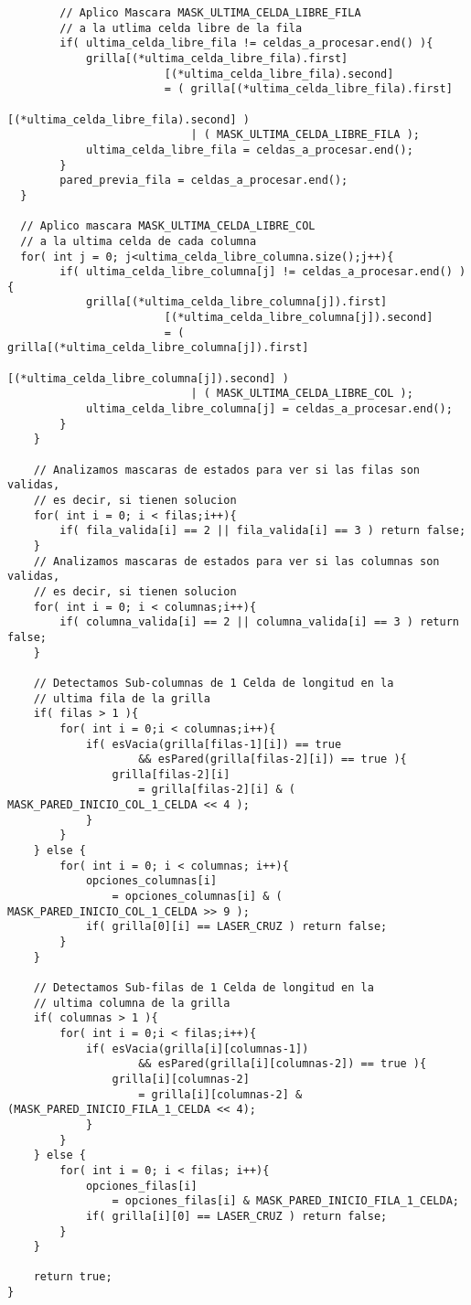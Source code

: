 \documentclass[11pt, a4paper, twoside]{article}
\begin{document}
\begin{lstlisting}
		// Aplico Mascara MASK_ULTIMA_CELDA_LIBRE_FILA
		// a la utlima celda libre de la fila
		if( ultima_celda_libre_fila != celdas_a_procesar.end() ){
			grilla[(*ultima_celda_libre_fila).first]
						[(*ultima_celda_libre_fila).second]
						= ( grilla[(*ultima_celda_libre_fila).first]
											[(*ultima_celda_libre_fila).second] )
							| ( MASK_ULTIMA_CELDA_LIBRE_FILA );
			ultima_celda_libre_fila = celdas_a_procesar.end();
		}
		pared_previa_fila = celdas_a_procesar.end();
  }
  
  // Aplico mascara MASK_ULTIMA_CELDA_LIBRE_COL
  // a la ultima celda de cada columna
  for( int j = 0; j<ultima_celda_libre_columna.size();j++){
		if( ultima_celda_libre_columna[j] != celdas_a_procesar.end() ){
			grilla[(*ultima_celda_libre_columna[j]).first]
						[(*ultima_celda_libre_columna[j]).second]
						= ( grilla[(*ultima_celda_libre_columna[j]).first]
											[(*ultima_celda_libre_columna[j]).second] )
							| ( MASK_ULTIMA_CELDA_LIBRE_COL );
			ultima_celda_libre_columna[j] = celdas_a_procesar.end();
		}
	}
	
	// Analizamos mascaras de estados para ver si las filas son validas,
	// es decir, si tienen solucion
	for( int i = 0; i < filas;i++){
		if( fila_valida[i] == 2 || fila_valida[i] == 3 ) return false;
	}
	// Analizamos mascaras de estados para ver si las columnas son validas,
	// es decir, si tienen solucion
	for( int i = 0; i < columnas;i++){
		if( columna_valida[i] == 2 || columna_valida[i] == 3 ) return false;
	}
	
	// Detectamos Sub-columnas de 1 Celda de longitud en la
	// ultima fila de la grilla
	if( filas > 1 ){
		for( int i = 0;i < columnas;i++){
			if( esVacia(grilla[filas-1][i]) == true
					&& esPared(grilla[filas-2][i]) == true ){
				grilla[filas-2][i]
					= grilla[filas-2][i] & ( MASK_PARED_INICIO_COL_1_CELDA << 4 );
			}
		}
	} else {
		for( int i = 0; i < columnas; i++){
			opciones_columnas[i]
				= opciones_columnas[i] & ( MASK_PARED_INICIO_COL_1_CELDA >> 9 );
			if( grilla[0][i] == LASER_CRUZ ) return false;
		}
	}
	
	// Detectamos Sub-filas de 1 Celda de longitud en la
	// ultima columna de la grilla
	if( columnas > 1 ){
		for( int i = 0;i < filas;i++){
			if( esVacia(grilla[i][columnas-1])
					&& esPared(grilla[i][columnas-2]) == true ){
				grilla[i][columnas-2]
					= grilla[i][columnas-2] & (MASK_PARED_INICIO_FILA_1_CELDA << 4);
			}
		}
	} else {
		for( int i = 0; i < filas; i++){
			opciones_filas[i]
				= opciones_filas[i] & MASK_PARED_INICIO_FILA_1_CELDA;
			if( grilla[i][0] == LASER_CRUZ ) return false;
		}
	}
	
	return true;
}
\end{lstlisting}
\end{document}
